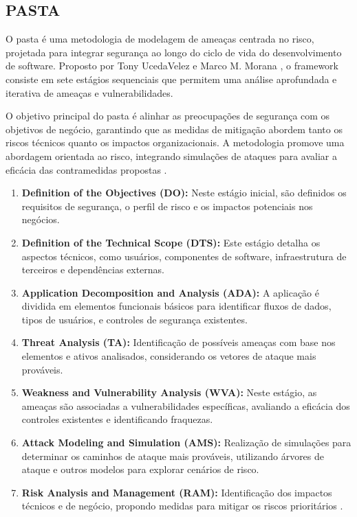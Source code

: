 \subsection{PASTA}
\label{subsec:pasta}

O \gls{pasta} é uma
metodologia de modelagem de ameaças centrada no risco, projetada para
integrar segurança ao longo do ciclo de vida do desenvolvimento de
software. Proposto por Tony UcedaVelez e Marco M. Morana
\cite{RiskCentricThreatModeling}, o framework consiste em sete
estágios sequenciais que permitem uma análise aprofundada e iterativa
de ameaças e vulnerabilidades.

O objetivo principal do \gls{pasta} é alinhar as preocupações de segurança
com os objetivos de negócio, garantindo que as medidas de mitigação
abordem tanto os riscos técnicos quanto os impactos organizacionais.
A metodologia promove uma abordagem orientada ao risco, integrando
simulações de ataques para avaliar a eficácia das contramedidas
propostas \cite{RiskCentricThreatModeling}.

\begin{enumerate}
    \item \textbf{Definition of the Objectives (DO):} Neste estágio
inicial, são definidos os requisitos de segurança, o perfil de risco e
os impactos potenciais nos negócios.
    \item \textbf{Definition of the Technical Scope (DTS):} Este
estágio detalha os aspectos técnicos, como usuários, componentes de
software, infraestrutura de terceiros e dependências externas.
    \item \textbf{Application Decomposition and Analysis (ADA):} A
aplicação é dividida em elementos funcionais básicos para identificar
fluxos de dados, tipos de usuários, e controles de segurança
existentes.
    \item \textbf{Threat Analysis (TA):} Identificação de possíveis
ameaças com base nos elementos e ativos analisados, considerando os
vetores de ataque mais prováveis.
    \item \textbf{Weakness and Vulnerability Analysis (WVA):} Neste
estágio, as ameaças são associadas a vulnerabilidades específicas,
avaliando a eficácia dos controles existentes e identificando
fraquezas.
    \item \textbf{Attack Modeling and Simulation (AMS):} Realização de
simulações para determinar os caminhos de ataque mais prováveis,
utilizando árvores de ataque e outros modelos para explorar cenários
de risco.
    \item \textbf{Risk Analysis and Management (RAM):} Identificação
dos impactos técnicos e de negócio, propondo medidas para mitigar os
riscos prioritários \cite{RiskCentricThreatModeling}.
\end{enumerate}

